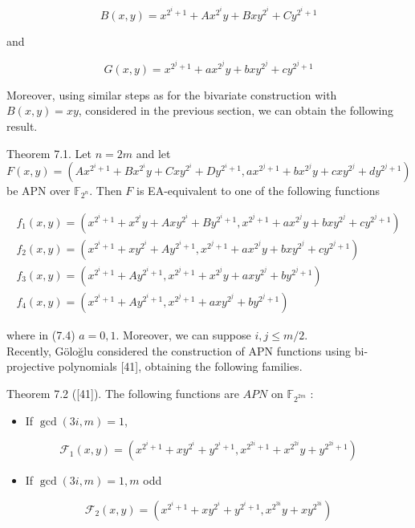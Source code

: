 \documentclass[10pt]{article}
\begin{document}
$$
B(x, y)=x^{2^{i}+1}+A x^{2^{i}} y+B x y^{2^{i}}+C y^{2^{i}+1}
$$

and

$$
G(x, y)=x^{2^{j}+1}+a x^{2^{j}} y+b x y^{2^{j}}+c y^{2^{j}+1}
$$

Moreover, using similar steps as for the bivariate construction with $B(x, y)=x y$, considered in the previous section, we can obtain the following result.

Theorem 7.1. Let $n=2 m$ and let $F(x, y)=\left(A x^{2^{i}+1}+B x^{2^{i}} y+C x y^{2^{i}}+D y^{2^{i}+1}, a x^{2^{j}+1}+b x^{2^{j}} y+c x y^{2^{j}}+d y^{2^{j}+1}\right)$ be APN over $\mathbb{F}_{2^{n}}$. Then $F$ is EA-equivalent to one of the following functions


\begin{gather*}
f_{1}(x, y)=\left(x^{2^{i}+1}+x^{2^{i}} y+A x y^{2^{i}}+B y^{2^{i}+1}, x^{2^{j}+1}+a x^{2^{j}} y+b x y^{2^{j}}+c y^{2^{j}+1}\right)  \tag{7.1}\\
f_{2}(x, y)=\left(x^{2^{i}+1}+x y^{2^{i}}+A y^{2^{i}+1}, x^{2^{j}+1}+a x^{2^{j}} y+b x y^{2^{j}}+c y^{2^{j}+1}\right)  \tag{7.2}\\
f_{3}(x, y)=\left(x^{2^{i}+1}+A y^{2^{i}+1}, x^{2^{j}+1}+x^{2^{j}} y+a x y^{2^{j}}+b y^{2^{j}+1}\right)  \tag{7.3}\\
f_{4}(x, y)=\left(x^{2^{i}+1}+A y^{2^{i}+1}, x^{2^{j}+1}+a x y^{2^{j}}+b y^{2^{j}+1}\right) \tag{7.4}
\end{gather*}


where in (7.4) $a=0,1$. Moreover, we can suppose $i, j \leq m / 2$.\\[0pt]
Recently, Göloğlu considered the construction of APN functions using bi-projective polynomials [41], obtaining the following families.

Theorem 7.2 ([41]). The following functions are $A P N$ on $\mathbb{F}_{2^{2 m}}$ :

\begin{itemize}
  \item If $\operatorname{gcd}(3 i, m)=1$,
\end{itemize}

$$
\mathcal{F}_{1}(x, y)=\left(x^{2^{i}+1}+x y^{2^{i}}+y^{2^{i}+1}, x^{2^{2 i}+1}+x^{2^{2 i}} y+y^{2^{2 i}+1}\right)
$$

\begin{itemize}
  \item If $\operatorname{gcd}(3 i, m)=1, m$ odd
\end{itemize}

$$
\mathcal{F}_{2}(x, y)=\left(x^{2^{i}+1}+x y^{2^{i}}+y^{2^{i}+1}, x^{2^{3 i}} y+x y^{2^{3 i}}\right)
$$
\end{document}
